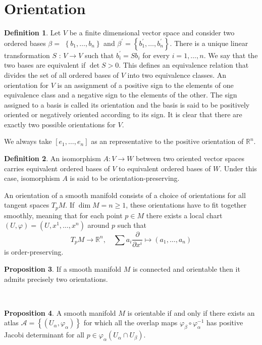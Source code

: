 \documentclass[12pt,a4paper]{book}
\newenvironment{prooff}{{\noindent\it\textcolor{cyan!40!black}{Proof}:}\,}{\par}
\newcommand{\bb}[1]{\mathbb{#1}}
\theoremstyle{definition}
\newtheorem{defn}{Definition}[section]
\newtheorem{prop}[defn]{Proposition}
\begin{document}
\section{Orientation}
\begin{defn}
    Let $V$ be a finite dimensional vector space and consider two ordered bases $\beta=$ $\left\{b_1, \ldots, b_n\right\}$ and $\beta^{\prime}=\left\{b_1^{\prime}, \ldots, b_n^{\prime}\right\}$.
    There is a unique linear transformation $S$ : $V \rightarrow V$ such that $b_i^{\prime}=S b_i$ for every $i=1, \ldots, n$. We say that the two bases are equivalent if $\operatorname{det} S>0$. This defines an equivalence relation that divides the set of all ordered bases of $V$ into two equivalence classes. An orientation for $V$ is an assignment of a positive sign to the elements of one equivalence class and a negative sign to the elements of the other. The sign assigned to a basis is called its orientation and the basis is said to be positively oriented or negatively oriented according to its sign.
    It is clear that there are exactly two possible orientations for $V$.

    We always take $[e_1,\dots,e_n]$ as an representative to the positive orientation of $\bb{R}^n$.
\end{defn}
\begin{defn}
    An isomorphism $A: V \rightarrow W$ between two oriented vector spaces
    carries equivalent ordered bases of $V$ to equivalent ordered bases of $W$.
    Under this case, isomorphism $A$ is said to be orientation-preserving.

    An orientation of a smooth manifold consists of a choice of orientations
    for all tangent spaces $T_p M$.
    If $\operatorname{dim} M=n \geq 1$, these orientations have to fit
    together smoothly, meaning that for each point $p \in M$ there exists a local chart $(U,\varphi)=(U,x^1,\dots,x^n)$ around $p$ such that
    $$
        T_pM\rightarrow \bb{R}^n,\quad \sum a_i\frac{\partial}{\partial x^i}\mapsto (a_1,\dots,a_n)
    $$
    is order-preserving.
\end{defn}
\begin{prop}
    If a smooth manifold $M$ is connected and orientable then it admits precisely two orientations.
\end{prop}
\begin{prooff}

\end{prooff}
\begin{prop}
    A smooth manifold $M$ is orientable if and only if
    there exists an atlas $\mathcal{A}=\left\{\left(U_\alpha, \varphi_\alpha\right)\right\}$
    for which all the overlap maps $\varphi_\beta \circ \varphi_\alpha^{-1}$ has positive Jacobi determinant for all $p\in \varphi_{\alpha}(U_{\alpha}\cap U_{\beta})$.
\end{prop}
\end{document}
